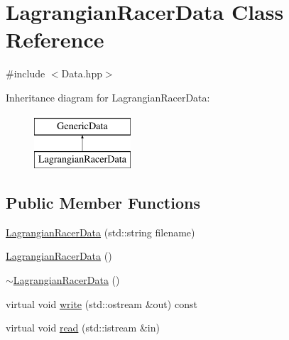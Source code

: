 \hypertarget{class_lagrangian_racer_data}{\section{Lagrangian\-Racer\-Data Class Reference}
\label{class_lagrangian_racer_data}
}


{\ttfamily \#include $<$Data.\-hpp$>$}

Inheritance diagram for Lagrangian\-Racer\-Data\-:\begin{figure}[H]
\begin{center}
\leavevmode
\includegraphics[height=2.000000cm]{class_lagrangian_racer_data}
\end{center}
\end{figure}
\subsection*{Public Member Functions}
\begin{DoxyCompactItemize}
\item 
\hyperlink{class_lagrangian_racer_data_a22776165f2f5e749a93238e4997f512e}{Lagrangian\-Racer\-Data} (std\-::string filename)
\item 
\hyperlink{class_lagrangian_racer_data_a4a07a05fba44af02d49fa689325dd809}{Lagrangian\-Racer\-Data} ()
\item 
\hyperlink{class_lagrangian_racer_data_aa643dd8a389074b4ef523a17f8c47423}{$\sim$\-Lagrangian\-Racer\-Data} ()
\item 
virtual void \hyperlink{class_lagrangian_racer_data_adbea50ddbb24883866bb828985fa6164}{write} (std\-::ostream \&out) const 
\item 
virtual void \hyperlink{class_lagrangian_racer_data_a5985c44e28872d0064596a3104f2feff}{read} (std\-::istream \&in)
\end{DoxyCompactItemize}
